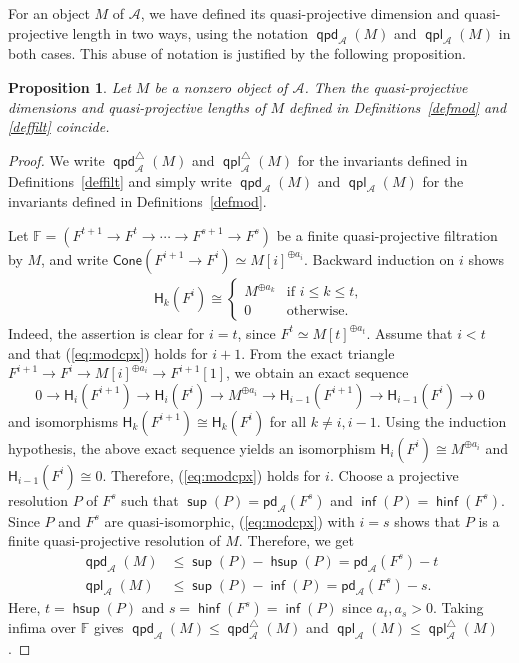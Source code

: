 \documentclass[10pt, a4paper,reqno]{amsart}
\newtheorem{prop}[prop]{Proposition}
\theoremstyle{definition}
\theoremstyle{remark}
\numberwithin{equation}{thm}
\def\FF{\mathbb{F}}
\def\cA{\mathcal{A}}
\def\sH{\mathsf{H}}
\def\sup{\operatorname{\mathsf{sup}}}
\def\hsup{\operatorname{\mathsf{hsup}}}
\def\inf{\operatorname{\mathsf{inf}}}
\def\hinf{\operatorname{\mathsf{hinf}}}
\def\Cone{\mathsf{Cone}}
\def\pd{\mathsf{pd}}
\def\qpd{\operatorname{\mathsf{qpd}}}
\def\qpl{\operatorname{\mathsf{qpl}}}
\begin{document}
For an object $M$ of $\cA$, we have defined its quasi-projective dimension and quasi-projective length in two ways, using the notation $\qpd_\cA(M)$ and $\qpl_\cA(M)$ in both cases.
This abuse of notation is justified by the following proposition.

\begin{prop}\label{modcpx}
Let $M$ be a nonzero object of $\cA$.
Then the quasi-projective dimensions and quasi-projective lengths of $M$ defined in Definitions~\ref{defmod} and \ref{deffilt} coincide.
\end{prop}

\begin{proof}
We write $\qpd_\cA^\triangle(M)$ and $\qpl_\cA^\triangle(M)$ for the invariants defined in Definitions~\ref{deffilt} and simply write $\qpd_\cA(M)$ and $\qpl_\cA(M)$ for the invariants defined in Definitions~\ref{defmod}.

Let $\FF=(F^{t+1}\to F^t\to\cdots\to F^{s+1}\to F^s)$ be a finite quasi-projective filtration by $M$, and write $\Cone(F^{i+1}\to F^i)\simeq M[i]^{\oplus a_i}$.
Backward induction on $i$ shows
\begin{align}\label{eq:modcpx}
\sH_k(F^i)\cong
\begin{cases}
M^{\oplus a_k}&\text{if }i\leq k\leq t,\\
0&\text{otherwise}.
\end{cases}
\end{align}
Indeed, the assertion is clear for $i=t$, since $F^t \simeq M[t]^{\oplus a_t}$.
Assume that $i < t$ and that (\ref{eq:modcpx}) holds for $i+1$.
From the exact triangle $F^{i+1} \to F^i \to M[i]^{\oplus a_i} \to F^{i+1}[1]$, we obtain an exact sequence
\[
0 \to \sH_{i}(F^{i+1}) \to \sH_{i}(F^{i}) \to M^{\oplus a_i} \to \sH_{i-1}(F^{i+1}) \to \sH_{i-1}(F^{i}) \to 0
\]
and isomorphisms $\sH_{k}(F^{i+1}) \cong \sH_{k}(F^{i})$ for all $k \neq i,i-1$.
Using the induction hypothesis, the above exact sequence yields an isomorphism $\sH_{i}(F^{i}) \cong M^{\oplus a_i}$ and $\sH_{i-1}(F^i) \cong 0$.
Therefore, (\ref{eq:modcpx}) holds for $i$.
Choose a projective resolution $P$ of $F^s$ such that $\sup(P) = \pd_\cA(F^s)$ and $\inf(P) = \hinf(F^s)$.
Since $P$ and $F^s$ are quasi-isomorphic, (\ref{eq:modcpx}) with $i=s$ shows that $P$ is a finite quasi-projective resolution of $M$.
Therefore, we get 
\begin{align*}
\qpd_\cA(M) &\le \sup(P) - \hsup(P) = \pd_\cA(F^s) - t \\
\qpl_\cA(M) &\le \sup(P) - \inf(P) = \pd_\cA(F^s) - s.
\end{align*}
Here, $t = \hsup(P)$ and $s = \hinf(F^s) = \inf(P)$ since $a_t, a_s > 0$.
Taking infima over $\FF$ gives $\qpd_\cA(M)\leq\qpd_\cA^\triangle(M)$ and $\qpl_\cA(M)\leq\qpl_\cA^\triangle(M)$.


\end{proof}
\end{document}
